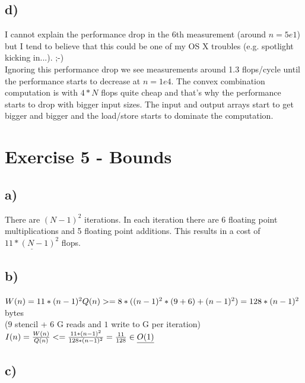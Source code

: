 \documentclass[10pt,a4paper,oneside,notitlepage]{report}
\begin{document}
\subsection*{d)}
I cannot explain the performance drop in the 6th measurement (around $n=5e1$) but I tend to believe that this could be one of my OS X troubles (e.g. spotlight kicking in...). ;-) \\
Ignoring this performance drop we see measurements around 1.3 flops/cycle until the performance starts to decrease at $n=1e4$. The convex combination computation is with $4*N$ flops quite cheap and that's why the performance starts to drop with bigger input sizes. The input and output arrays start to get bigger and bigger and the load/store starts to dominate the computation.

\section*{Exercise 5 - Bounds}
\subsection*{a)}
There are $(N-1)^2$ iterations. In each iteration there are 6 floating point multiplications and 5 floating point additions. This results in a cost of $\underline{11*(N-1)^2}$ flops.
\subsection*{b)}
$W(n) = 11*(n-1)^2 \\
Q(n) >= 8*((n-1)^2*(9 + 6) + (n-1)^2 ) = 128*(n-1)^2$  bytes \\($9$ stencil + $6$ G reads and $1$ write to G per iteration) \\
$I(n) = {W(n) \over Q(n)} <= {11*(n-1)^2 \over 128*(n-1)^2} = {11 \over 128} \in \underline{O(1)}$
\subsection*{c)}
\end{document}
